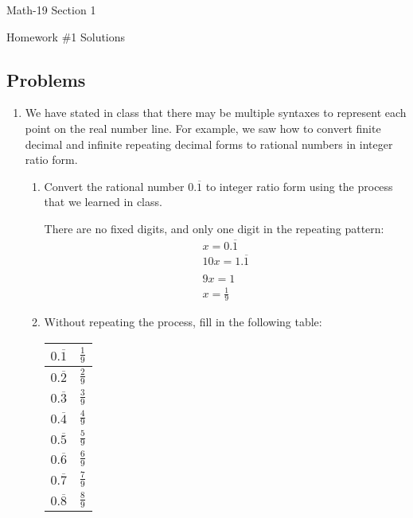 \documentclass[letterpaper,12pt,fleqn]{article}
\begin{document}
\begin{center}
  \large
  Math-19 Section 1

  \Large
  Homework \#1 Solutions
\end{center}

\subsection*{Problems}

\begin{enumerate}
\item We have stated in class that there may be multiple syntaxes to represent each point on the real number line.
  For example, we saw how to convert finite decimal and infinite repeating decimal forms to rational numbers in
  integer ratio form.
  \begin{enumerate}
  \item Convert the rational number \(0.\overline{1}\) to integer ratio form using the process that we learned in
    class.

    There are no fixed digits, and only one digit in the repeating pattern:
    \begin{gather*}
      x=0.\overline{1} \\
      10x=1.\overline{1} \\
      \\
      9x=1 \\
      x=\frac{1}{9}
    \end{gather*}
  \item Without repeating the process, fill in the following table:
    
    \renewcommand{\arraystretch}{2}
    \begin{tabular}{|c|p{0.25in}|}
      \hline
      \(0.\overline{1}\) & \(\frac{1}{9}\) \\
      \hline
      \(0.\overline{2}\) & \(\frac{2}{9}\) \\
      \hline
      \(0.\overline{3}\) & \(\frac{3}{9}\) \\
      \hline
      \(0.\overline{4}\) & \(\frac{4}{9}\) \\
      \hline
      \(0.\overline{5}\) & \(\frac{5}{9}\) \\
      \hline
      \(0.\overline{6}\) & \(\frac{6}{9}\) \\
      \hline
      \(0.\overline{7}\) & \(\frac{7}{9}\) \\
      \hline
      \(0.\overline{8}\) & \(\frac{8}{9}\) \\
      \hline
    \end{tabular}


\end{enumerate}
\end{enumerate}
\end{document}
